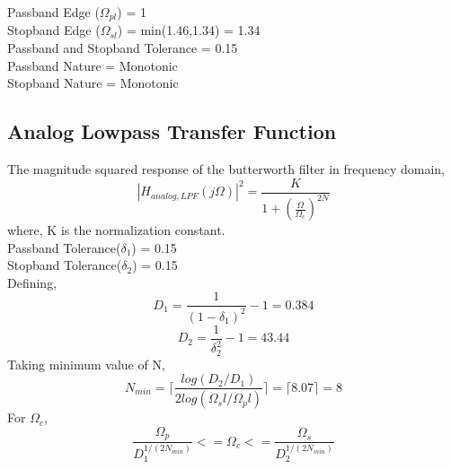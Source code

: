 \documentclass[12pt]{article}
\begin{document}
Passband Edge ($\Omega_{pl}$) = 1\\
Stopband Edge ($\Omega_{sl}$) = min(1.46,1.34) = 1.34\\
Passband and Stopband Tolerance = 0.15\\
Passband Nature = Monotonic\\
Stopband Nature = Monotonic

\subsection{Analog Lowpass Transfer Function}
The magnitude squared response of the butterworth filter in frequency domain,
\begin{equation}
    |H_{analog,LPF}(j\Omega)|^2 = \frac{K}{1 + (\frac{\Omega}{\Omega_c})^{2N}}
\end{equation}
where, K is the normalization constant.\\
Passband Tolerance($\delta_1$) = 0.15\\
Stopband Tolerance($\delta_2$) = 0.15\\
Defining,
\begin{equation}
    D_1 = \frac{1}{(1-\delta_1)^2}-1 = 0.384 
\end{equation}
\begin{equation}
    D_2 = \frac{1}{\delta_2^2}-1 = 43.44 
\end{equation}
Taking minimum value of N,
\begin{equation}
    N_{min} = \lceil\frac{log(D_2/D_1)}{2log(\Omega_sl/\Omega_pl)}\rceil = \lceil8.07\rceil = 8
\end{equation}
For $\Omega_c$,
\begin{equation}
    \frac{\Omega_p}{D_1^{1/(2N_{min})}} <= \Omega_c <= \frac{\Omega_s}{D_2^{1/(2N_{min})}}
\end{equation}
\end{document}
